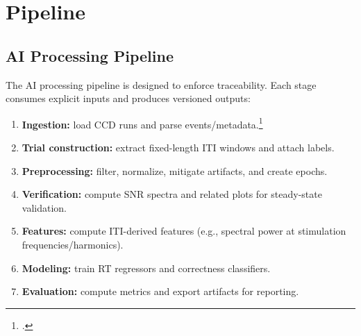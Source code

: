\FloatBarrier

\section{Pipeline}
\label{sec:pipeline}

\subsection{AI Processing Pipeline}
\label{subsec:ai-processing-pipeline}

The AI processing pipeline is designed to enforce traceability. Each stage consumes explicit inputs and produces versioned outputs:
\begin{enumerate}
    \item \textbf{Ingestion:} load CCD runs and parse events/metadata.\footnote{\cite{hbn_fair_2024}.}
    \item \textbf{Trial construction:} extract fixed-length ITI windows and attach labels.
    \item \textbf{Preprocessing:} filter, normalize, mitigate artifacts, and create epochs.
    \item \textbf{Verification:} compute SNR spectra and related plots for steady-state validation.
    \item \textbf{Features:} compute ITI-derived features (e.g., spectral power at stimulation frequencies/harmonics).
    \item \textbf{Modeling:} train RT regressors and correctness classifiers.
    \item \textbf{Evaluation:} compute metrics and export artifacts for reporting.
\end{enumerate}
